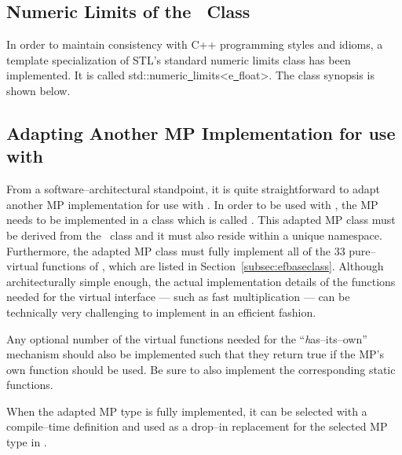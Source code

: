 \vspace{4.0pt}



\vspace{4.0pt}

\subsection{Numeric Limits of the \efloathyperref\ Class}

In order to maintain consistency with C++ programming styles and idioms,
a template specialization of STL's standard numeric limits class has
been implemented. It is called
{\courier std::\-nu\-me\-ric\underline\ lim\-its<e\underline\ float>}.
The class synopsis is shown below.

\vspace{4.0pt}



\vspace{4.0pt}

\subsection{Adapting Another MP Implementation for use with \efloathyperref}

From a software--architectural standpoint, it is quite straightforward
to adapt another MP implementation for use with \efloat.
In order to be used with \efloat, the MP needs to be implemented in a
class which is called \efloatclass. This adapted MP class must be
derived from the \efloatbaseclass\ class and it must also reside
within a unique namespace. Furthermore, the adapted MP class must fully
implement all of the $33$ pure--virtual functions of \efloatbaseclass,
which are listed in Section~\ref{subsec:efbaseclass}.
Although architecturally simple enough, the actual implementation details
of the functions needed for the
virtual interface --- such as fast multiplication --- can be
technically very challenging to implement in an efficient fashion.

Any optional number of the virtual functions needed for
the ``{\emph has--its--own}'' mechanism should also be implemented such
that they return {\courier true} if the MP's own function should
be used. Be sure to also implement the corresponding static functions.

When the adapted MP type is fully implemented, it can be selected
with a compile--time definition and used as a drop--in replacement
for the selected MP type in \efloat.

